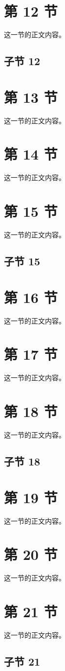 \documentclass{article}
\begin{document}
\section{第 12 节}
这一节的正文内容。
\subsection{子节 12}
\section{第 13 节}
这一节的正文内容。
\section{第 14 节}
这一节的正文内容。
\section{第 15 节}
这一节的正文内容。
\subsection{子节 15}
\section{第 16 节}
这一节的正文内容。
\section{第 17 节}
这一节的正文内容。
\section{第 18 节}
这一节的正文内容。
\subsection{子节 18}
\section{第 19 节}
这一节的正文内容。
\section{第 20 节}
这一节的正文内容。
\section{第 21 节}
这一节的正文内容。
\subsection{子节 21}
\end{document}
